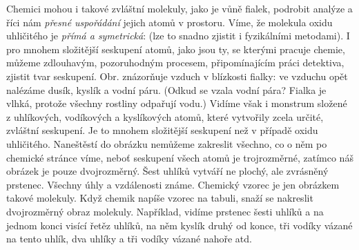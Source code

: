 \documentclass[
  paper=157.794mm:210.392mm,
  DIV=36,
  headinclude=false
]{scrbook}
\begin{document}
  Chemici mohou i takové zvláštní molekuly, jako je vůně fialek, podrobit analýze a říci nám
  \emph{přesné uspořádání} jejich atomů v prostoru. Víme, že molekula oxidu uhličitého je
  \emph{přímá a symetrická}: (lze to snadno zjistit i fyzikálními metodami). I pro mnohem složitější
  seskupení atomů, jako jsou ty, se kterými pracuje chemie, můžeme zdlouhavým, pozoruhodným
  procesem, připomínajícím práci detektiva, zjistit tvar seskupení. Obr. znázorňuje vzduch v
  blízkosti fialky: ve vzduchu opět nalézáme dusík, kyslík a vodní páru. (Odkud se vzala vodní pára?
  Fialka je vlhká, protože všechny rostliny odpařují vodu.) Vidíme však i monstrum složené z
  uhlíkových, vodíkových a kyslíkových atomů, které vytvořily zcela určité, zvláštní seskupení. Je
  to mnohem složitější seskupení než v případě oxidu uhličitého. Naneštěstí do obrázku nemůžeme
  zakreslit všechno, co o něm po chemické stránce víme, neboť seskupení všech atomů je trojrozměrné,
  zatímco náš obrázek je pouze dvojrozměrný. Šest uhlíků vytváří ne plochý, ale zvrásněný prstenec.
  Všechny úhly a vzdálenosti známe. Chemický vzorec je jen obrázkem takové molekuly. Když chemik
  napíše vzorec na tabuli, snaží se nakreslit dvojrozměrný obraz molekuly. Například, vidíme
  prstenec šesti uhlíků a na jednom konci visící řetěz uhlíků, na něm kyslík druhý od konce, tři
  vodíky vázané na tento uhlík, dva uhlíky a tři vodíky vázané nahoře atd.

  \blindtext[5]
 

 
\end{document}
